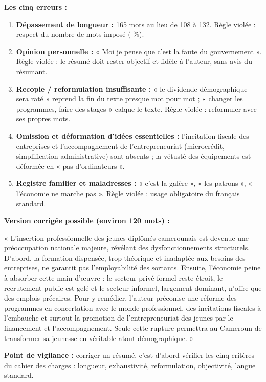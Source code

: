 \documentclass[11pt]{article}
\begin{document}
\begin{corrige}
\textbf{Les cinq erreurs :}
\begin{enumerate}
    \item \textbf{Dépassement de longueur :} 165 mots au lieu de 108 à 132. Règle violée : respect du nombre de mots imposé ( \%).
    \item \textbf{Opinion personnelle :} « Moi je pense que c'est la faute du gouvernement ». Règle violée : le résumé doit rester objectif et fidèle à l'auteur, sans avis du résumant.
    \item \textbf{Recopie / reformulation insuffisante :} « le dividende démographique sera raté » reprend la fin du texte presque mot pour mot ; « changer les programmes, faire des stages » calque le texte. Règle violée : reformuler avec ses propres mots.
    \item \textbf{Omission et déformation d'idées essentielles :} l'incitation fiscale des entreprises et l'accompagnement de l'entrepreneuriat (microcrédit, simplification administrative) sont absents ; la vétusté des équipements est déformée en « pas d'ordinateurs ».
    \item \textbf{Registre familier et maladresses :} « c'est la galère », « les patrons », « l'économie ne marche pas ». Règle violée : usage obligatoire du français standard.
\end{enumerate}

\textbf{Version corrigée possible (environ 120 mots) :}

« L'insertion professionnelle des jeunes diplômés camerounais est devenue une préoccupation nationale majeure, révélant des dysfonctionnements structurels. D'abord, la formation dispensée, trop théorique et inadaptée aux besoins des entreprises, ne garantit pas l'employabilité des sortants. Ensuite, l'économie peine à absorber cette main-d'œuvre : le secteur privé formel reste étroit, le recrutement public est gelé et le secteur informel, largement dominant, n'offre que des emplois précaires. Pour y remédier, l'auteur préconise une réforme des programmes en concertation avec le monde professionnel, des incitations fiscales à l'embauche et surtout la promotion de l'entrepreneuriat des jeunes par le financement et l'accompagnement. Seule cette rupture permettra au Cameroun de transformer sa jeunesse en véritable atout démographique. »

\textbf{Point de vigilance :} corriger un résumé, c'est d'abord vérifier les cinq critères du cahier des charges : longueur, exhaustivité, reformulation, objectivité, langue standard.
\end{corrige}
\end{document}
